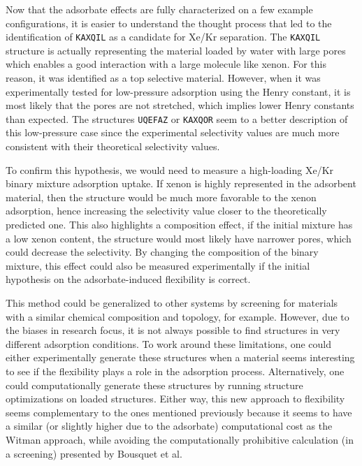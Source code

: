 \documentclass[main]{subfiles}
\begin{document}
Now that the adsorbate effects are fully characterized on a few example configurations, it is easier to understand the thought process that led to the identification of \texttt{KAXQIL} as a candidate for Xe/Kr separation. The \texttt{KAXQIL} structure is actually representing the material loaded by water with large pores which enables a good interaction with a large molecule like xenon. For this reason, it was identified as a top selective material. However, when it was experimentally tested for low-pressure adsorption using the Henry constant, it is most likely that the pores are not stretched, which implies lower Henry constants than expected. The structures \texttt{UQEFAZ} or \texttt{KAXQOR} seem to a better description of this low-pressure case since the experimental selectivity values are much more consistent with their theoretical selectivity values. 

To confirm this hypothesis, we would need to measure a high-loading Xe/Kr binary mixture adsorption uptake. If xenon is highly represented in the adsorbent material, then the structure would be much more favorable to the xenon adsorption, hence increasing the selectivity value closer to the theoretically predicted one. This also highlights a composition effect, if the initial mixture has a low xenon content, the structure would most likely have narrower pores, which could decrease the selectivity. By changing the composition of the binary mixture, this effect could also be measured experimentally if the initial hypothesis on the adsorbate-induced flexibility is correct.

This method could be generalized to other systems by screening for materials with a similar chemical composition and topology, for example. However, due to the biases in research focus, it is not always possible to find structures in very different adsorption conditions. To work around these limitations, one could either experimentally generate these structures when a material seems interesting to see if the flexibility plays a role in the adsorption process. Alternatively, one could computationally generate these structures by running structure optimizations on loaded structures. Either way, this new approach to flexibility seems complementary to the ones mentioned previously because it seems to have a similar (or slightly higher due to the adsorbate) computational cost as the Witman approach, while avoiding the computationally prohibitive calculation (in a screening) presented by Bousquet et al.\autocite{Bousquet2012} 
\end{document}
